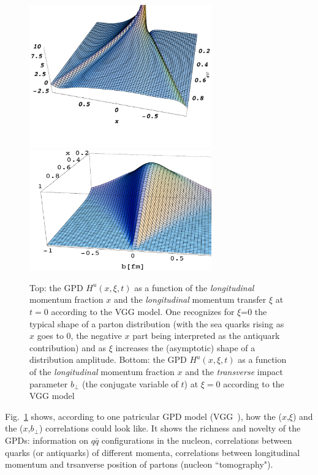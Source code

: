 \begin{figure}[htbp]
\begin{center}
\includegraphics[width=0.7\textwidth]{gpdxxi.pdf}
\includegraphics[width=0.7\textwidth]{gpdb_h_u_new.pdf}
\caption{Top: the GPD $H^u(x,\xi,t)$ as a function of the 
{\it longitudinal} momentum fraction $x$ and the {\it longitudinal} 
momentum transfer $\xi$ at $t=0$ according to the VGG model.
One recognizes for $\xi$=0 the typical shape of a parton distribution (with 
the sea quarks rising as $x$ goes to 0, the negative $x$ part being interpreted 
as the antiquark contribution) and as $\xi$ increases the (asymptotic) shape of
a distribution amplitude. Bottom: the GPD $H^u(x,\xi,t)$ as 
a function of the {\it longitudinal} momentum fraction $x$ and 
the {\it transverse} impact parameter $b_\perp$ (the conjugate variable of $t$)
at $\xi=0$ according to the VGG model}
\label{fig:gpdxxi-bperp}
\end{center}
\end{figure}

Fig.~\ref{fig:gpdxxi-bperp} shows, according to one patricular 
GPD model (VGG~\cite{marcprl2,goeke}),
how the ($x$,$\xi$) and the ($x$,$b_\perp$) correlations could look like.
It shows the richness and novelty of the GPDs: information on
$q{\bar q}$ configurations in the nucleon, correlations between quarks 
(or antiquarks) of different momenta, correlations between longitudinal
momentum and trsanverse position of partons (nucleon ``tomography").

